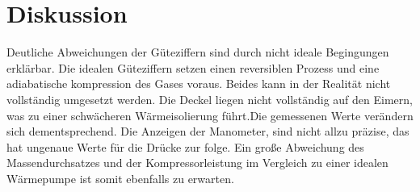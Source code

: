 \section{Diskussion}
\label{sec:Diskussion}

Deutliche Abweichungen der Güteziffern sind durch nicht ideale Begingungen erklärbar.
Die idealen Güteziffern setzen einen reversiblen Prozess und eine  adiabatische
kompression des Gases voraus. Beides kann in der Realität nicht vollständig
umgesetzt werden.
Die Deckel liegen nicht vollständig auf den Eimern, was zu einer schwächeren
Wärmeisolierung führt.Die gemessenen Werte verändern sich
dementsprechend. Die Anzeigen der Manometer, sind nicht allzu präzise, das hat
ungenaue Werte für die Drücke zur folge. Ein große Abweichung des Massendurchsatzes
und der Kompressorleistung im Vergleich zu einer idealen Wärmepumpe ist somit ebenfalls zu
erwarten.
